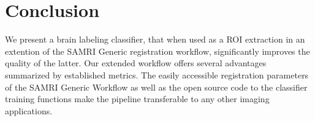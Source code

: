 \documentclass[11pt, english]{article}
\begin{document}
    \begin{sansmath}
    \end{sansmath}


    \section{Conclusion}
    We present a brain labeling classifier, that when used as a ROI extraction in an extention of the SAMRI Generic registration workflow, significantly improves the quality of the latter.
    Our extended workflow offers several advantages summarized by established metrics.
    The easily accessible registration parameters of the SAMRI Generic Workflow as well as the open source code to the classifier training functions make the pipeline transferable to any other imaging applications.




    \clearpage
    \printbibliography
\end{document}
